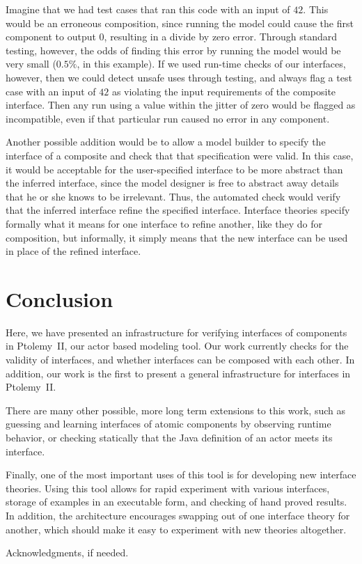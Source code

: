 \documentclass[preprint,11pt,authoryear]{sigplanconf}
\begin{document}
Imagine that we had test cases that ran this code with an input of $42$.
This would be an erroneous composition, since running the model could cause the first component to output $0$, resulting in a divide by zero error.
Through standard testing, however, the odds of finding this error by running the model would be very small ($0.5\%$, in this example).
If we used run-time checks of our interfaces, however, then we could detect unsafe uses through testing, and always flag a test case with an input of $42$ as violating the input requirements of the composite interface.
Then any run using a value within the jitter of zero would be flagged as incompatible, even if that particular run caused no error in any component.

Another possible addition would be to allow a model builder to specify the interface of a composite and check that that specification
were valid.
In this case, it would be acceptable for the user-specified interface to be more abstract than the inferred interface, since the model designer is free to abstract away details that he or she knows to be irrelevant.
Thus, the automated check would verify that the inferred interface refine the specified interface.
Interface theories specify formally what it means for one interface to refine another, like they do for composition, but informally, it simply means that the new interface can be used in place of the refined interface.

\section{Conclusion}
Here, we have presented an infrastructure for verifying interfaces of components in Ptolemy~II, our actor based modeling tool.
Our work currently checks for the validity of interfaces, and whether interfaces can be composed with each other.
In addition, our work is the first to present a general infrastructure for interfaces in Ptolemy~II.


There are many other possible, more long term extensions to this work, such as guessing and learning interfaces of atomic components by observing runtime behavior, or checking statically that the Java definition of an actor meets its interface.

Finally, one of the most important uses of this tool is for developing new interface theories.
Using this tool allows for rapid experiment with various interfaces, storage of examples in an executable form, and checking of hand proved results.
In addition, the architecture encourages swapping out of one interface theory for another, which should make it easy to experiment with new theories altogether.


\acks

Acknowledgments, if needed.




\end{document}
